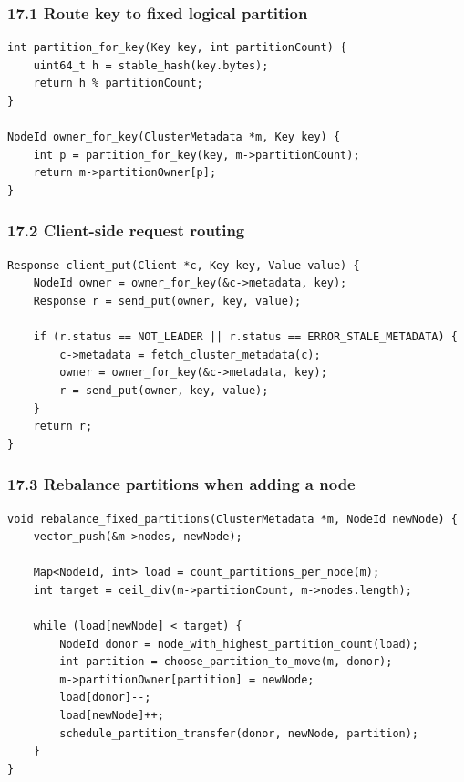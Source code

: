\documentclass[10pt,letterpaper]{article}
\begin{document}
\subsubsection*{17.1 Route key to fixed logical partition}

\begin{verbatim}
int partition_for_key(Key key, int partitionCount) {
    uint64_t h = stable_hash(key.bytes);
    return h % partitionCount;
}

NodeId owner_for_key(ClusterMetadata *m, Key key) {
    int p = partition_for_key(key, m->partitionCount);
    return m->partitionOwner[p];
}
\end{verbatim}

\subsubsection*{17.2 Client-side request routing}

\begin{verbatim}
Response client_put(Client *c, Key key, Value value) {
    NodeId owner = owner_for_key(&c->metadata, key);
    Response r = send_put(owner, key, value);

    if (r.status == NOT_LEADER || r.status == ERROR_STALE_METADATA) {
        c->metadata = fetch_cluster_metadata(c);
        owner = owner_for_key(&c->metadata, key);
        r = send_put(owner, key, value);
    }
    return r;
}
\end{verbatim}

\subsubsection*{17.3 Rebalance partitions when adding a node}

\begin{verbatim}
void rebalance_fixed_partitions(ClusterMetadata *m, NodeId newNode) {
    vector_push(&m->nodes, newNode);

    Map<NodeId, int> load = count_partitions_per_node(m);
    int target = ceil_div(m->partitionCount, m->nodes.length);

    while (load[newNode] < target) {
        NodeId donor = node_with_highest_partition_count(load);
        int partition = choose_partition_to_move(m, donor);
        m->partitionOwner[partition] = newNode;
        load[donor]--;
        load[newNode]++;
        schedule_partition_transfer(donor, newNode, partition);
    }
}
\end{verbatim}
\end{document}

